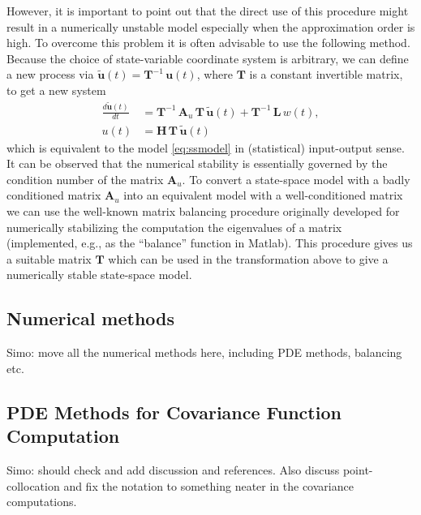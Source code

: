 \documentclass[journal]{IEEEtran}
\newcommand{\simo}[1]{{\color{red}#1}}
\begin{document}
However, it is important to point out that the direct use of this procedure might result in a numerically unstable model especially when the approximation order is high. To overcome this problem it is often advisable to use the following method. 
Because the choice of state-variable coordinate system is arbitrary, we can define a new process via $\tilde{\mathbf{u}}(t) = \mathbf{T}^{-1} \, \mathbf{u}(t)$, where $\mathbf{T}$ is a constant invertible matrix, to get a new system
%
\begin{equation}
\begin{split}
    \frac{d\tilde{\mathbf{u}}(t)}{dt}
    &= \mathbf{T}^{-1} \, \mathbf{A}_u \, \mathbf{T} \, \tilde{\mathbf{u}}(t)
    + \mathbf{T}^{-1} \, \mathbf{L} \, w(t), \\
   u(t) &= \mathbf{H} \, \mathbf{T} \, \tilde{\mathbf{u}}(t)
\end{split}
\end{equation}
%
which is equivalent to the model \eqref{eq:ssmodel} in (statistical) input-output sense. It can be observed that the numerical stability is essentially governed by the condition number of the matrix $\mathbf{A}_u$. To convert a state-space model with a badly conditioned matrix $\mathbf{A}_u$ into an equivalent model with a well-conditioned matrix we can use the well-known matrix balancing procedure
\cite{Parlett+Reinsch:1971}
originally developed for numerically stabilizing the computation the eigenvalues of a matrix (implemented, e.g., as the ``balance'' function in Matlab). This procedure gives us a suitable matrix $\mathbf{T}$ which can be used in the transformation above to give a numerically stable state-space model.

\subsection{Numerical methods}

\simo{Simo: move all the numerical methods here, including PDE methods, balancing etc.}

%

\subsection{PDE Methods for Covariance Function Computation}
%
\simo{Simo: should check and add discussion and references. Also discuss point-collocation and fix the notation to something neater in the covariance computations.}
\end{document}

